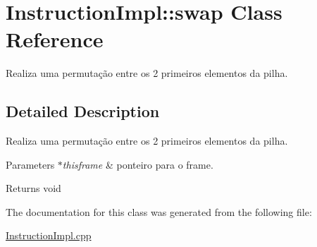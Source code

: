 \hypertarget{class_instruction_impl_1_1swap}{}\section{Instruction\+Impl\+:\+:swap Class Reference}
\label{class_instruction_impl_1_1swap}


Realiza uma permutação entre os 2 primeiros elementos da pilha.  




\subsection{Detailed Description}
Realiza uma permutação entre os 2 primeiros elementos da pilha. 


\begin{DoxyParams}{Parameters}
{\em $\ast$thisframe} & ponteiro para o frame. \\
\hline
\end{DoxyParams}
\begin{DoxyReturn}{Returns}
void 
\end{DoxyReturn}


The documentation for this class was generated from the following file\+:\begin{DoxyCompactItemize}
\item 
\hyperlink{_instruction_impl_8cpp}{Instruction\+Impl.\+cpp}\end{DoxyCompactItemize}
